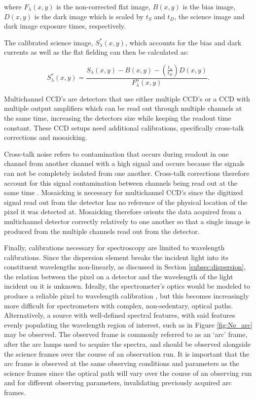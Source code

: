\noindent where $F_{\lambda}(x,y)$ is the non-corrected flat image, $B(x,y)$ is the bias image, $D(x,y)$ is the dark image which is scaled by $t_{S}$ and $t_{D}$, the science image and dark image exposure times, respectively.
\prgph

The calibrated science image, $S^{*}_{\lambda}(x,y)$, which accounts for the bias and dark currents as well as the flat fielding can then be calculated as:

\begin{equation}
    S^{*}_{\lambda}(x,y) = \frac{S_{\lambda}(x,y) - B(x,y) - (\frac{t_{S}}{t_{D}})D(x,y)}{F^{n}_{\lambda}(x,y)}.
    \label{eq:science_cal}
\end{equation}

Multichannel \gls{CCD}'s are detectors that use either multiple \gls{CCD}'s or a \gls{CCD} with multiple output amplifiers which can be read out through multiple channels at the same time, increasing the detectors size while keeping the readout time constant. These \gls{CCD} setups need additional calibrations, specifically cross-talk corrections and mosaicking.
\prgph

Cross-talk noise refers to contamination that occurs during readout in one channel from another channel with a high signal and occurs because the signals can not be completely isolated from one another. Cross-talk corrections therefore account for this signal contamination between channels being read out at the same time \citep{CrossTalk}. Mosaicking is necessary for multichannel \gls{CCD}'s since the digitized signal read out from the detector has no reference of the physical location of the pixel it was detected at. Mosaicking therefore orients the data acquired from a multichannel detector correctly relatively to one another so that a single image is produced from the multiple channels read out from the detector.
\prgph

Finally, calibrations necessary for spectroscopy are limited to wavelength calibrations. Since the dispersion element breaks the incident light into its constituent wavelengths non-linearly, as discussed in Section \ref{subsec:dispersion}, the relation between the pixel on a detector and the wavelength of the light incident on it is unknown. Ideally, the spectrometer's optics would be modeled to produce a reliable pixel to wavelength calibration \citep[see E.g.][]{WavCalSpectraModel}, but this becomes increasingly more difficult for spectrometers with complex, non-sedentary, optical paths. Alternatively, a source with well-defined spectral features, with said features evenly populating the wavelength region of interest, such as in Figure \ref{fig:Ne_arc} may be observed. The observed frame is commonly referred to as an `arc' frame, after the arc lamps used to acquire the spectra, and should be observed alongside the science frames over the course of an observation run. It is important that the arc frame is observed at the same observing conditions and parameters as the science frames since the optical path will vary over the course of an observing run and for different observing parameters, invalidating previously acquired arc frames.
\prgph

